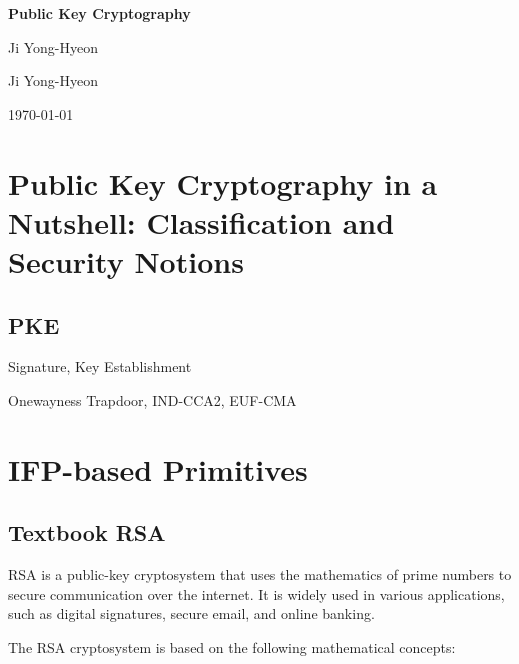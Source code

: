 \documentclass[12pt,openany]{book}
\theoremstyle{definition}
\begin{document}
	
	\begin{titlepage}
		\begin{center}
			{\Huge\textsf{\textbf{Public Key Cryptography}}\par}
			\vspace{0.5in}
			{\Large Ji Yong-Hyeon\par}
			\vspace{1in}
			\vspace{1in}
			{\large Ji Yong-Hyeon\par}
			{\large \today\par}
		\end{center}
	\end{titlepage}
	
	\tableofcontents
	
	\mainmatter
	
	\chapter{Public Key Cryptography in a Nutshell: Classification and Security Notions}
	
	\section{PKE}
	Signature, Key Establishment
	
	Onewayness Trapdoor, IND-CCA2, EUF-CMA
	
	
	\newpage
	\chapter{IFP-based Primitives}
	
	\section{Textbook RSA}
	
	RSA is a public-key cryptosystem that uses the mathematics of prime numbers to secure communication over the internet. It is widely used in various applications, such as digital signatures, secure email, and online banking.
	
	The RSA cryptosystem is based on the following mathematical concepts:
	
\end{document}
